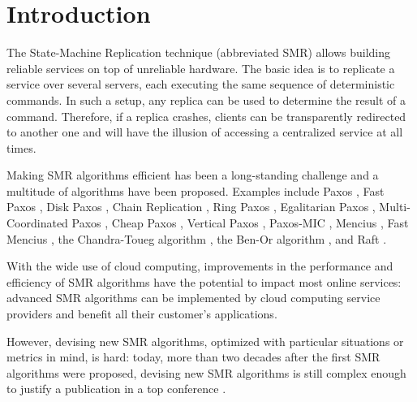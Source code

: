 \section{Introduction}

The State-Machine Replication technique (abbreviated SMR) allows building
reliable services on top of unreliable hardware. The basic idea is to
replicate a service over several servers, each executing the same sequence of
deterministic commands. In such a setup, any replica can be used to determine
the result of a command. Therefore, if a replica crashes, clients can be
transparently redirected to another one and will have the illusion of accessing
a centralized service at all times.

Making SMR algorithms efficient has been a long-standing challenge
and a multitude of algorithms have been proposed. Examples include
Paxos \cite{lamport2001paxos}, Fast Paxos \cite{Lamport06FastPaxos},
Disk Paxos \cite{GafniLamport03DiskPaxos}, Chain Replication
\cite{RenesseSchneider04ChainReplicationSupportingHighThroughputAvailability},
Ring Paxos \cite{MarandiETAL10RingPaxosHighthroughputAtomicBroadcastProtocol},
Egalitarian Paxos
\cite{MoraruAndersenKaminsky13ThereIsMoreConsensusEgalitarianParliaments},
Multi-Coordinated Paxos \cite{CamargosSchmidtPedone07MulticoordinatedPaxos},
Cheap Paxos \cite{LamportMassa04CheapPaxos}, Vertical Paxos
\cite{LamportMalkhiZhou09VerticalPaxosPrimarybackupReplication}, Paxos-MIC
\cite{HurfinMoiseNarzul11AdaptiveFastPaxosMakingQuickEverlasting}, Mencius
\cite{MaoJunqueiraMarzullo08MenciusBuildingEfficientReplicatedStateMachine},
Fast Mencius \cite{WeiETAL13FastMenciusMenciusLowCommitLatency},
the Chandra-Toueg algorithm
\cite{ChandraToueg96UnreliableFailureDetectorsReliableDistributedSystems}, the
Ben-Or algorithm \cite{BenOr83AnotherAdvantageFreeChoiceCompletelyAsynchronous},
and Raft \cite{OngaroOusterhout14SearchUnderstandableConsensusAlgorithm}.

With the wide use of cloud computing, improvements in the performance and
efficiency of SMR algorithms have the potential to impact most online services:
advanced SMR algorithms can be implemented by cloud computing service providers
and benefit all their customer's applications.

However, devising new SMR algorithms, optimized with
particular situations or metrics in mind, is hard: today,
more than two decades after the first SMR algorithms
\cite{Lamport98ParttimeParliament,BirmanJoseph87ReliableCommunicationPresenceFailures,OkiLiskov88ViewstampedReplicationGeneralPrimaryCopy,DworkLynchStockmeyer84ConsensusPresencePartialSynchronyPreliminaryVersion} were proposed, devising new
SMR algorithms is still complex enough to justify a publication in a top conference
\cite{MoraruAndersenKaminsky13ThereIsMoreConsensusEgalitarianParliaments,OngaroOusterhout14SearchUnderstandableConsensusAlgorithm}.

